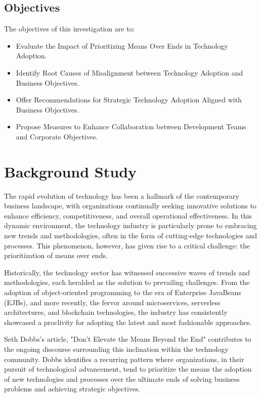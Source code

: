 \documentclass[a4Paper]{article}
\begin{document}
\subsection{Objectives}
The objectives of this investigation are to:
\begin{itemize}
\item Evaluate the Impact of Prioritizing Means Over Ends in Technology Adoption.
\item Identify Root Causes of Misalignment between Technology Adoption and Business Objectives.
\item Offer Recommendations for Strategic Technology Adoption Aligned with Business Objectives.
\item Propose Measures to Enhance Collaboration between Development Teams and Corporate Objectives.
\end{itemize}
\pagebreak

\section{Background Study}
The rapid evolution of technology has been a hallmark of the contemporary business landscape, with organizations continually seeking innovative solutions to enhance efficiency, competitiveness, and overall operational effectiveness. In this dynamic environment, the technology industry is particularly prone to embracing new trends and methodologies, often in the form of cutting-edge technologies and processes. This phenomenon, however, has given rise to a critical challenge: the prioritization of means over ends.

Historically, the technology sector has witnessed successive waves of trends and methodologies, each heralded as the solution to prevailing challenges. From the adoption of object-oriented programming to the era of Enterprise JavaBeans (EJBs), and more recently, the fervor around microservices, serverless architectures, and blockchain technologies, the industry has consistently showcased a proclivity for adopting the latest and most fashionable approaches.

Seth Dobbs's article, "Don't Elevate the Means Beyond the End" contributes to the ongoing discourse surrounding this inclination within the technology community. Dobbs identifies a recurring pattern where organizations, in their pursuit of technological advancement, tend to prioritize the means the adoption of new technologies and processes over the ultimate ends of solving business problems and achieving strategic objectives.
\end{document}
